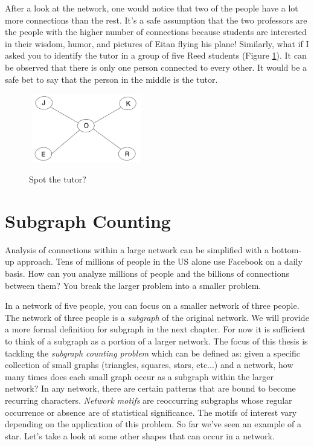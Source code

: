 \documentclass[12pt,twoside]{reedthesis}
\begin{document}
After a look at the network, one would notice that two of the people have a lot more connections than the rest. It's a safe assumption that the two professors are the people with the higher number of connections because students are interested in their wisdom, humor, and pictures of Eitan flying his plane! Similarly, what if I asked you to identify the tutor in a group of five Reed students (Figure \ref{fig:tutor}). It can be observed that there is only one person connected to every other. It would be a safe bet to say that the person in the middle is the tutor.

\begin{figure}[h]
	\caption{Spot the tutor?}
	\centering
	\includegraphics[width=5cm, height=3cm]{tutor}
	\label{fig:tutor}
\end{figure}

\section{Subgraph Counting}
Analysis of connections within a large network can be simplified with a bottom-up approach. Tens of millions of people in the US alone use Facebook on a daily basis. How can you analyze millions of people and the billions of connections between them? You break the larger problem into a smaller problem.

In a network of five people, you can focus on a smaller network of three people. The network of three people is a \textit{subgraph} of the original network. We will provide a more formal definition for subgraph in the next chapter. For now it is sufficient to think of a subgraph as a portion of a larger network. The focus of this thesis is tackling the \textit{subgraph counting problem} which can be defined as: given a specific collection of small graphs (triangles, squares, stars, etc...) and a network, how many times does each small graph occur as a subgraph within the larger network? In any network, there are certain patterns that are bound to become recurring characters. \textit{Network motifs} are reoccurring subgraphs whose regular occurrence or absence are of statistical significance. The motifs of interest vary depending on the application of this problem. So far we've seen an example of a star. Let's take a look at some other shapes that can occur in a network.
\end{document}
